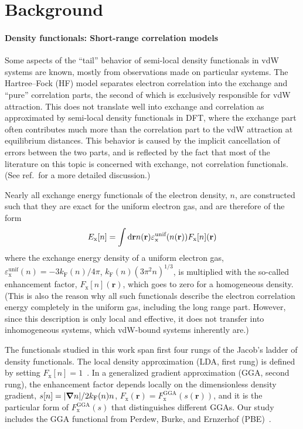 \section{Background}

\paragraph{Density functionals: Short-range correlation models}

Some aspects of the ``tail'' behavior of semi-local density functionals in vdW systems are known, mostly from observations made on particular systems.
The Hartree--Fock (HF) model separates electron correlation into the exchange and ``pure'' correlation parts, the second of which is exclusively responsible for vdW attraction.
This does not translate well into exchange and correlation as approximated by semi-local density functionals in DFT, where the exchange part often contributes much more than the correlation part to the vdW attraction at equilibrium distances.
This behavior is caused by the implicit cancellation of errors between the two parts, and is reflected by the fact that most of the literature on this topic is concerned with exchange, not correlation functionals.
(See ref.\,\cite{PengPRX16} for a more detailed discussion.)

Nearly all exchange energy functionals of the electron density, $n$, are constructed such that they are exact for the uniform electron gas, and are therefore of the form
\begin{equation}
  E_\mathrm x[n]=\int\mathrm d\mathbf rn(\mathbf r)\varepsilon^\text{unif}_\text x(n(\mathbf r))F_\mathrm x[n](\mathbf r)
  \label{eq:exchange-form}
\end{equation}
where the exchange energy density of a uniform electron gas, $\varepsilon^\text{unif}_\mathrm x(n)=-3k_\mathrm F(n)/4\pi$, $k_\mathrm F(n)(3\pi^2n)^{1/3}$, is multiplied with the so-called enhancement factor, $F_\mathrm x[n](\mathbf r)$, which goes to zero for a homogeneous density.
(This is also the reason why all such functionals describe the electron correlation energy completely in the uniform gas, including the long range part.
However, since this description is only local and effective, it does not transfer into inhomogeneous systems, which vdW-bound systems inherently are.)

The functionals studied in this work span first four rungs of the Jacob's ladder of density functionals.
The local density approximation (LDA, first rung) is defined by setting $F_\mathrm x[n]=1$~\cite{DiracMPCPS30}.
In a generalized gradient approximation (GGA, second rung), the enhancement factor depends locally on the dimensionless density gradient, $s[n]=\lvert\boldsymbol\nabla n\rvert/2k_\text F(n)n$, $F_\mathrm x(\mathbf r)=F^\text{GGA}_\mathrm x(s(\mathbf r))$, and it is the particular form of $F^\text{GGA}_\mathrm x(s)$ that distinguishes different GGAs.
Our study includes the GGA functional from Perdew, Burke, and Ernzerhof (PBE)~\cite{PerdewPRL96}.

